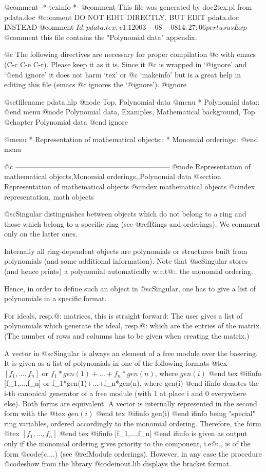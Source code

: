 @comment -*-texinfo-*-
@comment This file was generated by doc2tex.pl from pdata.doc
@comment DO NOT EDIT DIRECTLY, BUT EDIT pdata.doc INSTEAD
@comment $Id: pdata.tex,v 1.1 2003-08-08 14:27:06 pertusus Exp $
@comment this file contains the "Polynomial data" appendix.

@c The following directives are necessary for proper compilation
@c with emacs (C-c C-e C-r).  Please keep it as it is.  Since it
@c is wrapped in `@ignore' and `@end ignore' it does not harm `tex' or
@c `makeinfo' but is a great help in editing this file (emacs
@c ignores the `@ignore').
@ignore

@setfilename pdata.hlp
@node Top, Polynomial data
@menu
* Polynomial data::
@end menu
@node Polynomial data, Examples, Mathematical background, Top
@chapter Polynomial data
@end ignore

@menu
* Representation of mathematical objects::
* Monomial orderings::
@end menu

@c -----------------------------------------------------------------
@node Representation of mathematical objects,Monomial orderings,,Polynomial data
@section Representation of mathematical objects
@cindex mathematical objects
@cindex representation, math objects

@sc{Singular} distinguishes between objects which do not belong to a ring
and those which belong to a specific ring (see @ref{Rings and orderings}).
We comment only on the latter ones.

Internally all ring-dependent objects are polynomials or structures built from
polynomials (and some additional information).
Note that @sc{Singular} stores (and hence prints) a polynomial automatically
w.r.t@:. the monomial ordering.

Hence, in order to define such an object in @sc{Singular},
one has to give a list of polynomials in a specific format.

For ideals, resp.@: matrices, this is straight forward:
The user gives a list of polynomials
which generate the ideal, resp.@: which are the entries of the matrix.
(The number of rows and columns has to be given when creating the matrix.)

A vector  in @sc{Singular} is always an element of a free module over the
basering. It is given as a list of polynomials in one of the following
formats
@tex
$[f_1,...,f_n]$ or $f_1*gen(1)+...+f_n*gen(n)$, where $gen(i)$
@end tex
@ifinfo
[f_1,...,f_n] or f_1*gen(1)+...+f_n*gen(n), where gen(i)
@end ifinfo
denotes the i-th canonical generator of a free module (with 1 at place i and
0 everywhere else).
Both forms are equivalent. A vector is internally represented in
the second form with the
@tex
$gen(i)$
@end tex
@ifinfo
gen(i)
@end ifinfo
being "special" ring variables, ordered accordingly to the monomial ordering.
Therefore, the form
@tex
$[f_1,...,f_n]$
@end tex
@ifinfo
[f_1,...,f_n]
@end ifinfo
is given as output only if the monomial ordering gives priority to the
component, i.e@:., is of the form @code{(c,...)} (see @ref{Module
orderings}).  However, in any case the procedure @code{show} from the
library @code{inout.lib} displays the bracket format.


